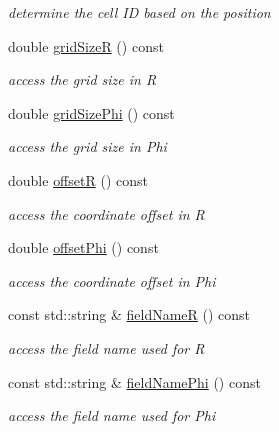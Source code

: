 \begin{DoxyCompactItemize}
\begin{DoxyCompactList}\small\item\em determine the cell ID based on the position \end{DoxyCompactList}\item 
double \hyperlink{class_d_d4hep_1_1_d_d_segmentation_1_1_polar_grid_r_phi_a2fa9f81e23ed537e262664532523ca9d}{grid\+SizeR} () const
\begin{DoxyCompactList}\small\item\em access the grid size in R \end{DoxyCompactList}\item 
double \hyperlink{class_d_d4hep_1_1_d_d_segmentation_1_1_polar_grid_r_phi_a93f5cd60097fdcf0ec456db8a85c0991}{grid\+Size\+Phi} () const
\begin{DoxyCompactList}\small\item\em access the grid size in Phi \end{DoxyCompactList}\item 
double \hyperlink{class_d_d4hep_1_1_d_d_segmentation_1_1_polar_grid_r_phi_a9fad9e5f76c9947d1f86445ff09696b0}{offsetR} () const
\begin{DoxyCompactList}\small\item\em access the coordinate offset in R \end{DoxyCompactList}\item 
double \hyperlink{class_d_d4hep_1_1_d_d_segmentation_1_1_polar_grid_r_phi_af0b7a0b03f4fb258c57306aa8175a8a0}{offset\+Phi} () const
\begin{DoxyCompactList}\small\item\em access the coordinate offset in Phi \end{DoxyCompactList}\item 
const std\+::string \& \hyperlink{class_d_d4hep_1_1_d_d_segmentation_1_1_polar_grid_r_phi_a5d523c6212aa4154ae4f4ee4e3f8baab}{field\+NameR} () const
\begin{DoxyCompactList}\small\item\em access the field name used for R \end{DoxyCompactList}\item 
const std\+::string \& \hyperlink{class_d_d4hep_1_1_d_d_segmentation_1_1_polar_grid_r_phi_a70e45f77d55dec9166dbe93ade4ec29e}{field\+Name\+Phi} () const
\begin{DoxyCompactList}\small\item\em access the field name used for Phi \end{DoxyCompactList}\item 

\end{DoxyCompactItemize}
